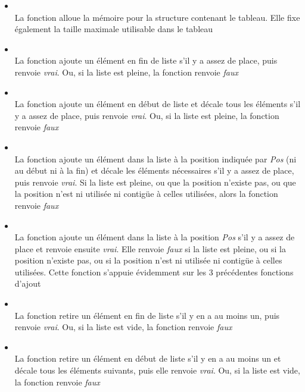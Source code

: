 \documentclass[11pt,a4paper]{article}
\begin{document}
\begin{itemize}
\item {}\\
      La fonction alloue la mémoire pour la structure contenant le tableau. Elle fixe également la taille maximale utilisable dans le tableau
%
\item {}\\
      La fonction ajoute un élément en fin de liste s'il y a assez de place, puis renvoie \textit{vrai}. Ou, si la liste est pleine, la fonction renvoie \textit{faux}
\item {}\\
      La fonction ajoute un élément en début de liste et décale tous les éléments s'il y a assez de place, puis renvoie \textit{vrai}. Ou, si la liste est pleine, la fonction renvoie \textit{faux}
\item {}\\
      La fonction ajoute un élément dans la liste à la position indiquée par \textit{Pos} (ni au début ni à la fin) et décale les éléments nécessaires s'il y a assez de place, puis renvoie \textit{vrai}. Si la liste est pleine, ou que la position n'existe pas, ou que la position n'est ni utilisée ni contigüe à celles utilisées, alors la fonction renvoie \textit{faux}
\item {}\\
      La fonction ajoute un élément dans la liste à la position \textit{Pos} s'il y a assez de place et renvoie ensuite \textit{vrai}. Elle renvoie \textit{faux} si la liste est pleine, ou si la position n'existe pas, ou si la position n'est ni utilisée ni contigüe à celles utilisées. Cette fonction s'appuie évidemment sur les 3 précédentes fonctions d'ajout
%
\item {}\\
      La fonction retire un élément en fin de liste s'il y en a au moins un, puis renvoie \textit{vrai}. Ou, si la liste est vide, la fonction renvoie \textit{faux}
\item {}\\
      La fonction retire un élément en début de liste s'il y en a au moins un et décale tous les éléments suivants, puis elle renvoie \textit{vrai}. Ou, si la liste est vide, la fonction renvoie \textit{faux}

\end{itemize}
\end{document}
